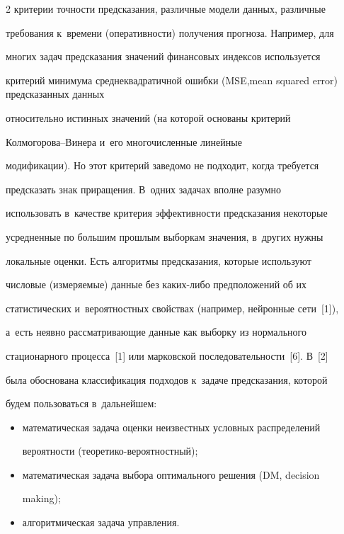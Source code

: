 \begin{multicols}{2}
критерии точности предсказания, \mbox{различные} модели данных, различные 


требования к~времени (оперативности) получения прогноза. Например, для 


многих задач предсказания значений финансовых индексов используется 


критерий минимума среднеквадратичной ошибки (MSE,\linebreak mean squared error) предсказанных данных 


относительно истинных значений (на которой основаны критерий  


Кол\-мо\-го\-ро\-ва--Ви\-не\-ра и~его многочисленные линейные 


модификации). Но этот \mbox{критерий} заведомо не подходит, когда требуется 


предсказать знак приращения. В~одних задачах вполне разумно 


использовать в~качестве критерия эффективности предсказания некоторые 


усредненные по большим прошлым выборкам значения, в~других нужны 


локальные оценки. Есть алгоритмы предсказания, которые используют 


числовые (измеряемые) данные без ка\-ких-ли\-бо предположений об их 


статистических и~вероятностных свойствах (например, нейронные сети~[1]), 


а~есть неявно рассматривающие данные как выборку из нормального 


стационарного процесса~[1] или марковской последовательности~[6]. В~[2] 


была обоснована классификация подходов к~задаче предсказания, которой 


будем пользоваться в~дальнейшем:


  \begin{itemize}


\item математическая задача оценки неизвестных условных распределений 


вероятности (тео\-ре\-ти\-ко-ве\-ро\-ят\-ност\-ный);


  \item математическая задача выбора оптимального решения (DM, decision 


making);


  \item алгоритмическая задача управления.



\end{itemize}
\end{multicols}
